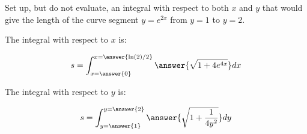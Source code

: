 \documentclass{ximera}
\author{Jim Talamo}
\begin{document}
\begin{exercise}

Set up, but do not evaluate, an integral with respect to both $x$ and $y$ that would give the length of the curve segment $y=e^{2x}$ from $y=1$ to $y=2$.

The integral with respect to $x$ is:

\[
s= \int_{x=\answer{0}}^{x=\answer{\ln(2)/2}} \answer{\sqrt{1+4e^{4x}}} dx
\]

The integral with respect to $y$ is:

\[
s= \int_{y=\answer{1}}^{y=\answer{2}} \answer{\sqrt{1+\frac{1}{4y^2}}} dy
\]

\end{exercise}
\end{document}
